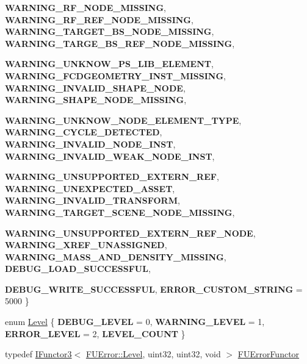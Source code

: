 \begin{DoxyCompactItemize}
\par
{\bfseries WARNING\_\-RF\_\-NODE\_\-MISSING}, 
{\bfseries WARNING\_\-RF\_\-REF\_\-NODE\_\-MISSING}, 
{\bfseries WARNING\_\-TARGET\_\-BS\_\-NODE\_\-MISSING}, 
{\bfseries WARNING\_\-TARGE\_\-BS\_\-REF\_\-NODE\_\-MISSING}, 
\par
{\bfseries WARNING\_\-UNKNOW\_\-PS\_\-LIB\_\-ELEMENT}, 
{\bfseries WARNING\_\-FCDGEOMETRY\_\-INST\_\-MISSING}, 
{\bfseries WARNING\_\-INVALID\_\-SHAPE\_\-NODE}, 
{\bfseries WARNING\_\-SHAPE\_\-NODE\_\-MISSING}, 
\par
{\bfseries WARNING\_\-UNKNOW\_\-NODE\_\-ELEMENT\_\-TYPE}, 
{\bfseries WARNING\_\-CYCLE\_\-DETECTED}, 
{\bfseries WARNING\_\-INVALID\_\-NODE\_\-INST}, 
{\bfseries WARNING\_\-INVALID\_\-WEAK\_\-NODE\_\-INST}, 
\par
{\bfseries WARNING\_\-UNSUPPORTED\_\-EXTERN\_\-REF}, 
{\bfseries WARNING\_\-UNEXPECTED\_\-ASSET}, 
{\bfseries WARNING\_\-INVALID\_\-TRANSFORM}, 
{\bfseries WARNING\_\-TARGET\_\-SCENE\_\-NODE\_\-MISSING}, 
\par
{\bfseries WARNING\_\-UNSUPPORTED\_\-EXTERN\_\-REF\_\-NODE}, 
{\bfseries WARNING\_\-XREF\_\-UNASSIGNED}, 
{\bfseries WARNING\_\-MASS\_\-AND\_\-DENSITY\_\-MISSING}, 
{\bfseries DEBUG\_\-LOAD\_\-SUCCESSFUL}, 
\par
{\bfseries DEBUG\_\-WRITE\_\-SUCCESSFUL}, 
{\bfseries ERROR\_\-CUSTOM\_\-STRING} =  5000
 \}
\item 
enum \hyperlink{classFUError_ac4b066f99c221e180ecfe9183fabbf3c}{Level} \{ {\bfseries DEBUG\_\-LEVEL} =  0, 
{\bfseries WARNING\_\-LEVEL} =  1, 
{\bfseries ERROR\_\-LEVEL} =  2, 
{\bfseries LEVEL\_\-COUNT}
 \}
\item 
typedef \hyperlink{classIFunctor3}{IFunctor3}$<$ \hyperlink{classFUError_ac4b066f99c221e180ecfe9183fabbf3c}{FUError::Level}, uint32, uint32, void $>$ \hyperlink{classFUError_af681c10c56bca8c0ca09d2a996a85b4b}{FUErrorFunctor}
\end{DoxyCompactItemize}
